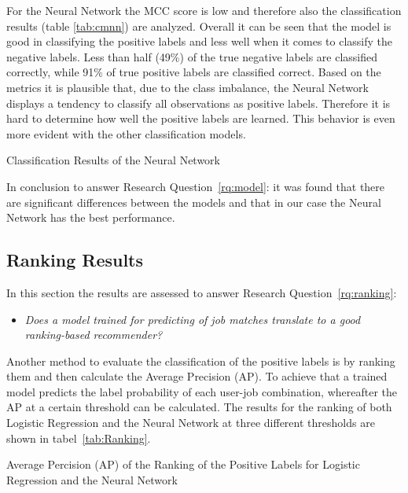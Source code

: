For the Neural Network the MCC score is low and therefore also the classification results (table \ref{tab:cmnn}) are analyzed.
Overall it can be seen that the model is good in classifying the positive labels and less well when it comes to classify the negative labels.
Less than half (49\%) of the true negative labels are classified correctly, while 91\% of true positive labels are classified correct.
Based on the metrics it is plausible that, due to the class imbalance, the Neural Network displays a tendency to classify all observations as positive labels.
Therefore it is hard to determine how well the positive labels are learned.
This behavior is even more evident with the other classification models.

\begin{table}[h]
\begin{footnotesize}

\end{footnotesize}
\caption{\label{tab:cmnn} \footnotesize{Classification Results of the Neural Network}}
\end{table}

In conclusion to answer Research Question~\ref{rq:model}: it was found that there are significant differences between the models and that in our case the Neural Network has the best performance.

\subsection{Ranking Results}
\label{ssec:rr}

In this section the results are assessed to answer Research Question~\ref{rq:ranking}:
\begin{itemize}
	\item[] \em Does a model trained for predicting of job matches translate to a good ranking-based recommender?
\end{itemize}

\noindent Another method to evaluate the classification of the positive labels is by ranking them and then calculate the Average Precision (AP).
To achieve that a trained model predicts the label probability of each user-job combination, whereafter the AP at a certain threshold can be calculated.
The results for the ranking of both Logistic Regression and the Neural Network at three different thresholds are shown in tabel~\ref{tab:Ranking}.

\begin{table}[H]
\begin{footnotesize}

\end{footnotesize}
\caption{\footnotesize{\label{tab:Ranking} Average Percision (AP) of the Ranking of the Positive Labels for Logistic Regression and the Neural Network}}
\end{table}

